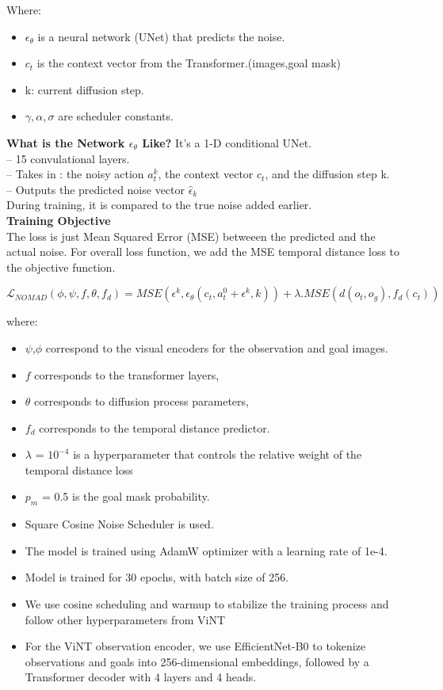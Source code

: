 \documentclass[12pt]{article}
\begin{document}
Where:
\begin{itemize}
    \item $\epsilon_{\theta}$ is a neural network (UNet) that predicts the noise.
    \item $c_t$ is the context vector from the Transformer.(images,goal mask)
    \item k: current diffusion step.
    \item $\gamma, \alpha ,\sigma$ are scheduler constants.
\end{itemize}
\textbf{What is the Network $\epsilon_{\theta}$ Like?}
It's a 1-D conditional UNet.\\
-- 15 convulational layers.\\
-- Takes in : the noisy action $a^{k}_t$, the context vector $c_t$, and the diffusion step k.\\
-- Outputs the predicted noise vector $\hat{\epsilon}_k$\\
During training, it is compared to the true noise added earlier.\\
\textbf{Training Objective}\\
The loss is just Mean Squared Error (MSE) betweeen the predicted and the actual noise. For overall loss function, we add the MSE temporal distance loss to the objective function.\\
\begin{center}
   \[ 
   \mathcal{L}_{NOMAD}(\phi,\psi,f,\theta,f_d) = MSE(\epsilon^{k}, \epsilon_{\theta}(c_t, a^{0}_t + \epsilon^{k},k)) + \lambda .MSE(d(o_t, o_g), f_{d}(c_t))
   \]
\end{center}
where:\\
\begin{itemize}
    \item $\psi$,$\phi$ correspond to the visual encoders for the observation and goal images.
    \item $f$ corresponds to the transformer layers,
    \item $\theta$ corresponds to diffusion process parameters,
    \item $f_d$ corresponds to the temporal distance predictor.
    \item $\lambda$ = $10^{-4}$ is a hyperparameter that controls the relative weight of the temporal distance loss
    \item $p_m$ = 0.5 is the goal mask probability.
    \item Square Cosine Noise Scheduler is used.
    \item The model is trained using AdamW optimizer with a learning rate of 1e-4.
    \item Model is trained for 30 epochs, with batch size of 256.
    \item We use cosine scheduling and warmup to stabilize the training process and follow other hyperparameters from ViNT 
    \item For the ViNT observation encoder, we use EfficientNet-B0 to tokenize observations and goals into 256-dimensional embeddings, followed by a Transformer decoder with 4 layers and 4 heads.
\end{itemize}
\end{document}
